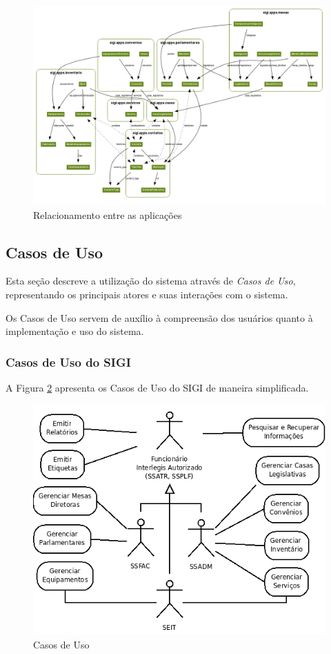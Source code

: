\begin{figure}[p]
  \centering
  \includegraphics[angle=90,width=130mm]{../imagens/apps.png}
  \caption{Relacionamento entre as aplicações}
  \label{fig:apps}
\end{figure}

\subsection{Casos de Uso}
\label{sec:casos}

Esta seção descreve a utilização do sistema através de \emph{Casos de
  Uso}, representando os principais atores e suas interações com o
sistema.

Os Casos de Uso servem de auxílio à compreensão dos usuários quanto à
implementação e uso do sistema.

\subsubsection{Casos de Uso do SIGI}
A Figura \ref{fig:casos} apresenta os Casos de Uso do SIGI de maneira
simplificada.

\begin{figure}[h]
  \centering
  \includegraphics[width=120mm]{../imagens/casosdeuso.png}
  \caption{Casos de Uso}
  \label{fig:casos}
\end{figure}

